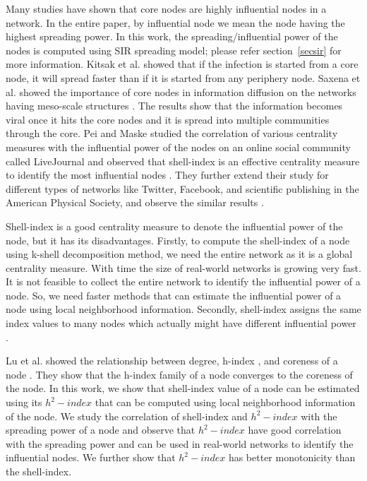 \documentclass[12pt,3p]{article}
\begin{document}

Many studies have shown that core nodes are highly influential nodes in a network. In the entire paper, by influential node we mean the node having the highest spreading power. In this work, the spreading/influential power of the nodes is computed using SIR spreading model; please refer section~\ref{secsir} for more information. Kitsak et al. \cite{kitsak2010identification} showed that if the infection is started from a core node, it will spread faster than if it is started from any periphery node. Saxena et al. showed the importance of core nodes in information diffusion on the networks having meso-scale structures \cite{saxena2015understanding}. The results show that the information becomes viral once it hits the core nodes and it is spread into multiple communities through the core. Pei and Maske studied the correlation of various centrality measures with the influential power of the nodes on an online social community called LiveJournal and observed that shell-index is an effective centrality measure to identify the most influential nodes \cite{pei2013spreading}. They further extend their study for different types of networks like Twitter, Facebook, and scientific publishing in the American Physical Society, and observe the similar results \cite{pei2014searching}.


Shell-index is a good centrality measure to denote the influential power of the node, but it has its disadvantages. Firstly, to compute the shell-index of a node using k-shell decomposition method, we need the entire network as it is a global centrality measure.  With time the size of real-world networks is growing very fast. It is not feasible to collect the entire network to identify the influential power of a node. So, we need faster methods that can estimate the influential power of a node using local neighborhood information. Secondly, shell-index assigns the same index values to many nodes which actually might have different influential power \cite{zareie2018hierarchical, wang2016fast, zeng2013ranking}. 


Lu et al. showed the relationship between degree, h-index \cite{hirsch2005index}, and coreness of a node \cite{lu2016h}. They show that the h-index family of a node converges to the coreness of the node. In this work, we show that shell-index value of a node can be estimated using its $h^2-index$ that can be computed using local neighborhood information of the node. We study the correlation of shell-index and $h^2-index$ with the spreading power of a node and observe that $h^2-index$ have good correlation with the spreading power and can be used in real-world networks to identify the influential nodes. We further show that $h^2-index$ has better monotonicity than the shell-index. 
\end{document}
